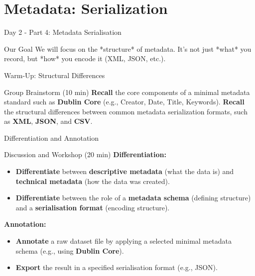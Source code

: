 \documentclass{integrity} %
\begin{document}
\section{Metadata: Serialization}

\begin{frame}{Day 2 - Part 4: Metadata Serialisation}
    \begin{block}{Our Goal}
        We will focus on the *structure* of metadata. It's not just *what* you record, but *how* you encode it (XML, JSON, etc.).
    \end{block}
\end{frame}

\begin{frame}{Warm-Up: Structural Differences}
    \begin{block}{Group Brainstorm (10 min)}
        \textbf{Recall} the core components of a minimal metadata standard such as \textbf{Dublin Core} (e.g., Creator, Date, Title, Keywords).
        \pause
        \textbf{Recall} the structural differences between common metadata serialization formats, such as \textbf{XML}, \textbf{JSON}, and \textbf{CSV}.
    \end{block}
\end{frame}

\begin{frame}{Differentiation and Annotation}
    \begin{block}{Discussion and Workshop (20 min)}
        \textbf{Differentiation:}
        \begin{itemize}
            \item \textbf{Differentiate} between \textbf{descriptive metadata} (what the data is) and \textbf{technical metadata} (how the data was created).
            \item \textbf{Differentiate} between the role of a \textbf{metadata schema} (defining structure) and a \textbf{serialisation format} (encoding structure).
        \end{itemize}
        \pause
        \textbf{Annotation:}
        \begin{itemize}
            \item \textbf{Annotate} a raw dataset file by applying a selected minimal metadata schema (e.g., using \textbf{Dublin Core}).
            \item \textbf{Export} the result in a specified serialisation format (e.g., JSON).
        \end{itemize}
    \end{block}
\end{frame}
\end{document}

